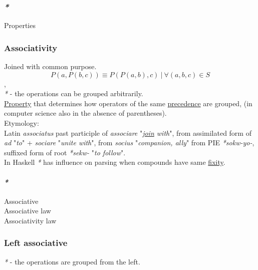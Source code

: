 \documentclass[11pt]{article}
\begin{document}
\subsubsection{\emph{*}}
\label{sec:orgd88543e}

\label{org85fb3a1}Properties\\

\subsubsection{\label{org488de22}Associativity}
\label{sec:org2d4ffad}
Joined with common purpose.\\

$$ P(a,P(b,c)) \equiv P(P(a,b),c) \ | \ \forall (a,b,c) \in S $$,\\

\emph{*} - the operations can be grouped arbitrarily.\\

\hyperref[orgf8c3cc7]{Property} that determines how operators of the same \hyperref[orgb0d1e87]{precedence} are grouped, (in computer science also in the absence of parentheses).\\

Etymology:\\
Latin \emph{associatus} past participle of \emph{associare} "\emph{\hyperref[org949a0df]{join} with}", from assimilated form of \emph{ad} "\emph{to}" + \emph{sociare} "\emph{unite with}", from \emph{socius} "\emph{companion, ally}" from PIE \emph{*sokw-yo-}, suffixed form of root \emph{*sekw-} "\emph{to follow}".\\

In Haskell \emph{*} has influence on parsing when compounds have same \hyperref[org561ae24]{fixity}.\\

\paragraph{\emph{*}}
\label{sec:org95c9e7b}

\label{orgbef8a27}Associative\\
\label{org3750198}Associative law\\
\label{org64e54f5}Associativity law\\

\subsubsection{\label{orgd4f8e09}Left associative}
\label{sec:orga5538d5}
\emph{*} - the operations are grouped from the left.\\
\end{document}
